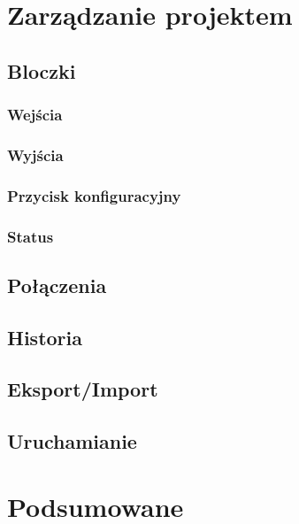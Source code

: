 \documentclass[a4paper,10pt]{article}
\begin{document}
\section{Zarządzanie projektem}
\subsection{Bloczki}
\subsubsection{Wejścia}
\subsubsection{Wyjścia}
\subsubsection{Przycisk konfiguracyjny}
\subsubsection{Status}
\subsection{Połączenia}
\subsection{Historia}
\subsection{Eksport/Import}
\subsection{Uruchamianie}
\section{Podsumowane}
\end{document}
